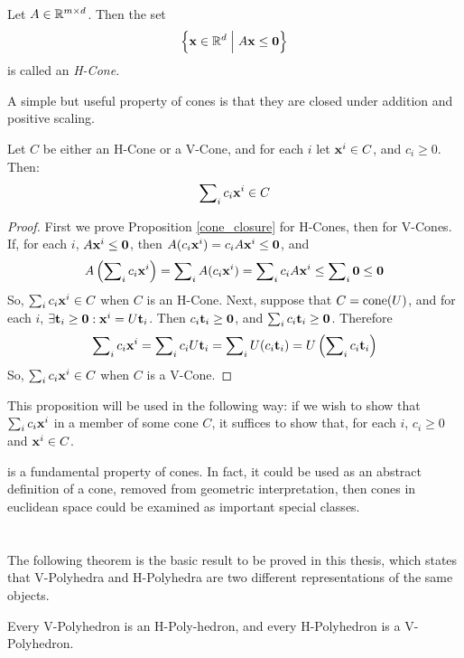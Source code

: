 \begin{Def}[H-Cone]{
		Let $A \in \mathbb{R}^{{m}\times d}$. Then the set
		\[ \left\{\mathbf{x} \in \mathbb{R}^d \;\Big|\; A\mathbf{x} \leq \mathbf{0}\right\} \]
		is called an \em{H-Cone}.
	}\end{Def}

A simple but useful property of cones is that they are closed under addition and positive scaling.

\begin{Prop}\label{cone_closure}
	Let $C$ be either an H-Cone or a V-Cone, and for each $i$ let $\mathbf{x}^i \in C$, and $c_i \geq 0$.  Then:
	\[ \sum\nolimits_i c_i \mathbf{x}^i \in C \]
\end{Prop}

\begin{proof}
	First we prove Proposition \ref{cone_closure} for H-Cones, then for V-Cones.
	If, for each $i$, $A\mathbf{x}^i \leq \mathbf{0}$, then $A(c_i\mathbf{x}^i) = c_iA\mathbf{x}^i \leq \mathbf{0}$, and
	\[ A\left(\sum\nolimits_i c_i\mathbf{x}^i\right) = \sum\nolimits_i A (c_i\mathbf{x}^i) =
		\sum\nolimits_i c_i A\mathbf{x}^i \leq \sum\nolimits_i \mathbf{0} \leq \mathbf{0} \]
	So, $\sum\nolimits_i c_i\mathbf{x}^i \in C$ when $C$ is an H-Cone.  Next, suppose that $C = \operatorname{cone}(U)$, and for each $i$, $\exists \mathbf{t}_i \geq \mathbf{0}: \mathbf{x}^i = U\mathbf{t}_i$.  Then $c_i\mathbf{t}_i \geq \mathbf{0}$, and $\sum\nolimits_i c_i\mathbf{t}_i \geq \mathbf{0}$.  Therefore
	\[ \sum\nolimits_i c_i\mathbf{x}^i = \sum\nolimits_i c_i U\mathbf{t}_i = \sum\nolimits_i U(c_i\mathbf{t}_i)
		= U\left(\sum\nolimits_i c_i\mathbf{t}_i\right) \]
	So, $\sum\nolimits_i c_i\mathbf{x}^i \in C$ when $C$ is a V-Cone.
\end{proof}

This proposition will be used in the following way: if we wish to show that $\sum\nolimits_i c_i\mathbf{x}^i$ in a member of some cone $C$, it suffices to show that, for each $i$, $c_i \geq 0$ and $\mathbf{x}^i \in C$.

\begin{Remark}
 is a fundamental property of cones.  In fact, it could be used as an abstract definition of a cone, removed from geometric interpretation, then cones in euclidean space could be examined as important special classes.
\end{Remark}


\section{\MWT}

The following theorem is the basic result to be proved in this thesis, which states that V-Polyhedra and H-Polyhedra are two different representations of the same objects.

\begin{Thm}[{\MWT}]
		Every V-Polyhedron is an H-Poly-hedron, and every H-Polyhedron is a V-Polyhedron.
\end{Thm}
